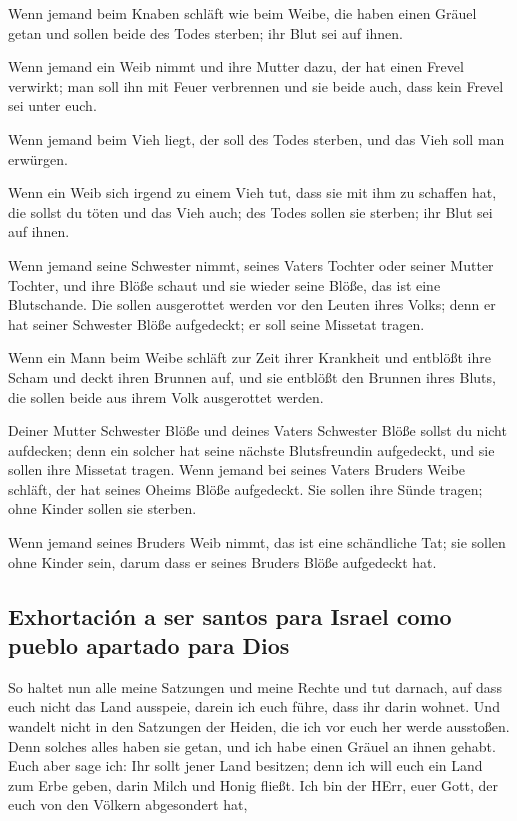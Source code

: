  Wenn jemand beim Knaben schläft wie beim Weibe, die
haben einen Gräuel getan und sollen beide des Todes sterben; ihr Blut
sei auf ihnen.

 Wenn jemand ein Weib nimmt und ihre Mutter dazu, der hat
einen Frevel verwirkt; man soll ihn mit Feuer verbrennen und sie beide
auch, dass kein Frevel sei unter euch.

 Wenn jemand beim Vieh liegt, der soll des Todes sterben,
und das Vieh soll man erwürgen.

 Wenn ein Weib sich irgend zu einem Vieh tut, dass sie
mit ihm zu schaffen hat, die sollst du töten und das Vieh auch; des
Todes sollen sie sterben; ihr Blut sei auf ihnen.

 Wenn jemand seine Schwester nimmt, seines Vaters Tochter
oder seiner Mutter Tochter, und ihre Blöße schaut und sie wieder seine
Blöße, das ist eine Blutschande. Die sollen ausgerottet werden vor den
Leuten ihres Volks; denn er hat seiner Schwester Blöße aufgedeckt; er
soll seine Missetat tragen.

 Wenn ein Mann beim Weibe schläft zur Zeit ihrer
Krankheit und entblößt ihre Scham und deckt ihren Brunnen auf, und sie
entblößt den Brunnen ihres Bluts, die sollen beide aus ihrem Volk
ausgerottet werden.

 Deiner Mutter Schwester Blöße und deines Vaters
Schwester Blöße sollst du nicht aufdecken; denn ein solcher hat seine
nächste Blutsfreundin aufgedeckt, und sie sollen ihre Missetat tragen.
 Wenn jemand bei seines Vaters Bruders Weibe schläft, der
hat seines Oheims Blöße aufgedeckt. Sie sollen ihre Sünde tragen; ohne
Kinder sollen sie sterben.

 Wenn jemand seines Bruders Weib nimmt, das ist eine
schändliche Tat; sie sollen ohne Kinder sein, darum dass er seines
Bruders Blöße aufgedeckt hat.

\hypertarget{exhortaciuxf3n-a-ser-santos-para-israel-como-pueblo-apartado-para-dios}{%
\subsection{Exhortación a ser santos para Israel como pueblo apartado
para
Dios}\label{exhortaciuxf3n-a-ser-santos-para-israel-como-pueblo-apartado-para-dios}}

 So haltet nun alle meine Satzungen und meine Rechte und
tut darnach, auf dass euch nicht das Land ausspeie, darein ich euch
führe, dass ihr darin wohnet.  Und wandelt nicht in den
Satzungen der Heiden, die ich vor euch her werde ausstoßen. Denn solches
alles haben sie getan, und ich habe einen Gräuel an ihnen gehabt.
 Euch aber sage ich: Ihr sollt jener Land besitzen; denn
ich will euch ein Land zum Erbe geben, darin Milch und Honig fließt. Ich
bin der HErr, euer Gott, der euch von den Völkern abgesondert hat,

